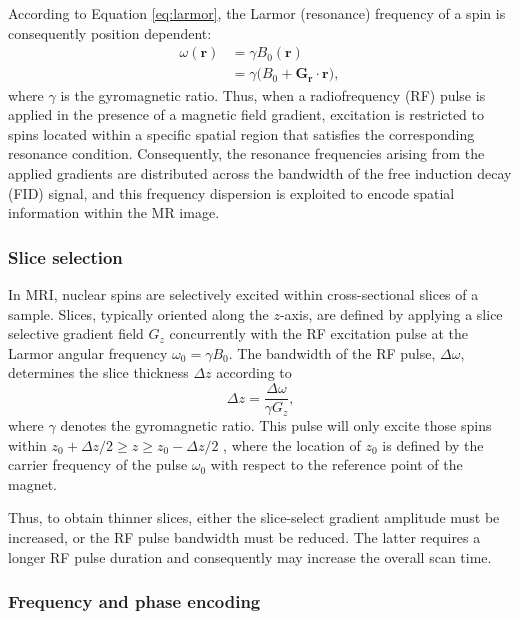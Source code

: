 According to Equation \ref{eq:larmor}, the Larmor (resonance) frequency of a spin is consequently position dependent:
\begin{equation}
\begin{aligned}
    \omega(\mathbf{r})
    &= \gamma B_0(\mathbf{r}) \\
    &= \gamma \bigl(B_0 + \mathbf{G_r} \cdot \mathbf{r}\bigr),
\end{aligned}
\label{eq:larmorreloaded}
\end{equation}
where $\gamma$ is the gyromagnetic ratio. Thus, when a radiofrequency (RF) pulse is applied in the presence of a magnetic field gradient, excitation is restricted to spins located within a specific spatial region that satisfies the corresponding resonance condition. Consequently, the resonance frequencies arising from the applied gradients are distributed across the bandwidth of the free induction decay (FID) signal, and this frequency dispersion is exploited to encode spatial information within the MR image.


\subsubsection{Slice selection}

    
In MRI, nuclear spins are selectively excited within cross-sectional slices of a sample. Slices, typically oriented along the $z$-axis, are defined by applying a slice selective gradient field $G_z$ concurrently with the RF excitation pulse at the Larmor angular frequency $\omega_{0} = \gamma B_0$. The bandwidth of the RF pulse, $\Delta\omega$, determines the slice thickness $\Delta z$ according to
\begin{equation}
    \Delta z = \frac{\Delta \omega}{\gamma G_z}\text{,}
\end{equation}
where $\gamma$ denotes the gyromagnetic ratio. This pulse will only excite those spins within $z_{0} + \Delta z/2 \geq z \geq z_{0}-\Delta z/2$ , where the location of $z_{0}$ is defined by the carrier frequency of the pulse $\omega_{0}$ with respect
to the reference point of the magnet.

Thus, to obtain thinner slices, either the slice-select gradient amplitude must be increased, or the RF pulse bandwidth must be reduced. The latter requires a longer RF pulse duration and consequently may increase the overall scan time.


\subsubsection{Frequency and phase encoding}


